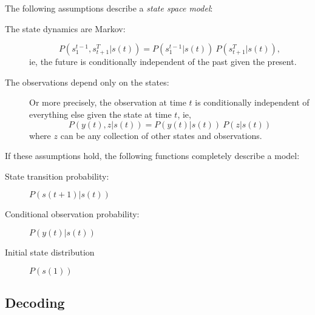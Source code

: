 \documentclass[11pt]{article}
\newcommand{\ti}[2]{{#1}{(#2)}}                         %
\newcommand{\ts}[4]{{#1}_{#3}^{#4}} %
\begin{document}
The following assumptions describe a \emph{state space model}:
\begin{description}
\item[The state dynamics are Markov:]
  \begin{equation}
    \label{eq:Markov}
    P(\ts{s}{\tau}{1}{t-1},\ts{s}{\tau}{t+1}{T}|\ti{s}{t}) =
    P(\ts{s}{\tau}{1}{t-1}|\ti{s}{t}) ~ P(\ts{s}{\tau}{t+1}{T}|\ti{s}{t}),
  \end{equation}
  ie, the future is conditionally independent of the past given the present.
\item[The observations depend only on the states:] Or more precisely,
  the observation at time $t$ is conditionally independent of
  everything else given the state at time $t$, ie,
  \begin{equation}
    \label{eq:IndependentY}
    P(\ti{y}{t},z|\ti{s}{t}) =  P(\ti{y}{t}|\ti{s}{t}) ~  P(z|\ti{s}{t})
  \end{equation}
  where $z$ can be any collection of other states and observations.
\end{description}
If these assumptions hold, the following functions completely describe
a model:
\begin{description}
\item[State transition probability:] $P(\ti{s}{t+1}|\ti{s}{t})$
\item[Conditional observation probability:] $P(\ti{y}{t}|\ti{s}{t})$
\item[Initial state distribution] $P(\ti{s}{1})$
\end{description}

\subsection*{Decoding}
\label{sec:decoding}
\end{document}
